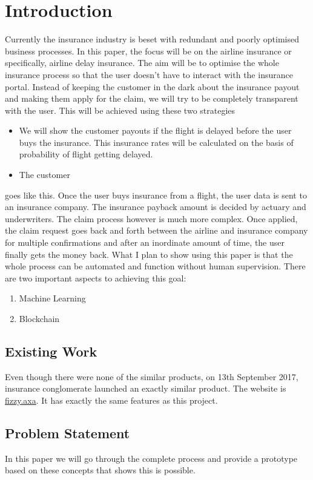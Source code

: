 \chapter{Introduction}

Currently the insurance industry is beset with redundant and poorly optimised business processes. In this paper, the focus will be on the airline insurance or specifically, airline delay insurance. The aim will be to optimise the whole insurance process so that the user doesn't have to interact with the insurance portal. Instead of keeping the customer in the dark about the insurance payout and making them apply for the claim, we will try to be completely  transparent with the user. This will be  achieved using these two strategies
\begin{itemize}
    \item We will show the customer payouts if the flight is delayed before the user buys the insurance. This insurance rates will be calculated on the basis of probability of flight getting delayed.
    \item The customer 
\end{itemize}

goes like this. Once the user buys insurance from a flight, the user data is sent to an insurance company. The insurance payback amount is decided by actuary and underwriters. The claim process however is much more complex. Once applied, the claim request goes back and forth between the airline and insurance company for multiple confirmations and after an inordinate amount of time, the user finally gets the money back. What I plan to show using this paper is that the whole process can be automated and function without human supervision. There are two important aspects to achieving this goal:
\begin{enumerate}
    \item Machine Learning
    \item Blockchain
\end{enumerate}

\section{Existing Work}
Even though there were none of the similar products, on 13th September 2017, insurance conglomerate launched an exactly similar product. The website is \url{fizzy.axa}. It has exactly the same features as this project. 
\section{Problem Statement}
In this paper we will go through the complete process and provide a prototype based on these concepts that shows this is possible.

